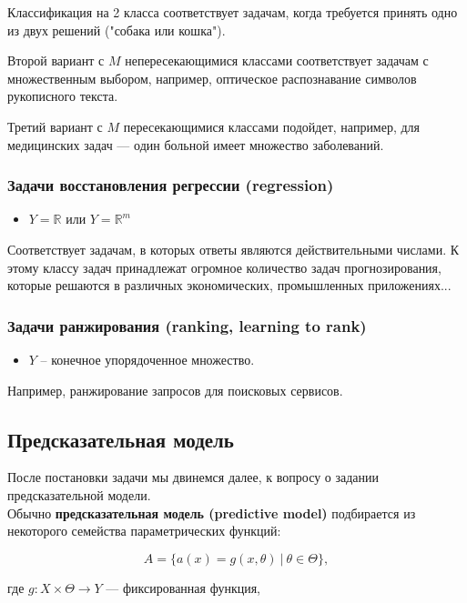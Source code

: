 \documentclass{article}
\begin{document}
Классификация на 2 класса соответствует задачам, когда требуется принять одно из двух решений ("собака или кошка").

Второй вариант с $M$ непересекающимися классами соответствует задачам с множественным выбором, например, оптическое распознавание символов рукописного текста.

Третий вариант с $M$ пересекающимися классами подойдет, например, для медицинских задач --- один больной имеет множество заболеваний.

\subsubsection{Задачи восстановления регрессии (regression)}

\begin{itemize}
\item $Y = \mathbb{R}$ или $Y = \mathbb{R}^m$
\end{itemize}

Соответствует задачам, в которых ответы являются действительными числами. К этому классу задач принадлежат огромное количество задач прогнозирования, которые решаются в различных экономических, промышленных приложениях...

\subsubsection{Задачи ранжирования (ranking, learning to rank)}

\begin{itemize}
\item $Y$ -- конечное упорядоченное множество.
\end{itemize}

Например, ранжирование запросов для поисковых сервисов.

\subsection{Предсказательная модель}

После постановки задачи мы двинемся далее, к вопросу о задании предсказательной модели. 
\\

Обычно \textbf{предсказательная модель (predictive model)} подбирается из некоторого семейства параметрических функций:

$$ A = \{a(x) = g(x, \theta)\ | \ \theta \in \Theta\},$$

где $g : X \times \Theta \rightarrow Y$ --- фиксированная функция,
\end{document}
